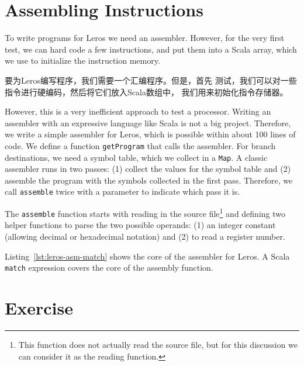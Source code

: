 \documentclass[%
    10pt,
    headinclude, footexclude,
    openright, %
    notitlepage,
    cleardoubleempty,
    headsepline,
    pointlessnumbers,
    bibtotoc, idxtotoc,
    ]{scrbook}
\newcommand{\code}[1]{{\small{\texttt{#1}}}}
\newcommand{\todo}[1]{{\emph{TODO: #1}}}
\renewcommand{\todo}[1]{}
\begin{document}

\section{Assembling Instructions}

To write programs for Leros we need an assembler. However, for the very first
test, we can hard code a few instructions, and put them into a Scala array,
which we use to initialize the instruction memory.

要为Leros编写程序，我们需要一个汇编程序。但是，首先
测试，我们可以对一些指令进行硬编码，然后将它们放入Scala数组中，
我们用来初始化指令存储器。


\noindent However, this is a very inefficient approach to test a processor.
Writing an assembler with an expressive language like Scala is not a big project.
Therefore, we write a simple assembler for Leros, which is possible within about
100 lines of code. We define a function \code{getProgram} that calls the assembler.
For branch destinations, we need a symbol table, which we collect in a \code{Map}.
A classic assembler runs in two passes: (1) collect the values for the symbol table
and (2) assemble the program with the symbols collected in the first pass.
Therefore, we call \code{assemble} twice with a parameter to indicate which pass it is.


The \code{assemble} function starts with reading in the source
file\footnote{This function does not actually read the source file, but for this
discussion we can consider it as the reading function.}
and defining two helper functions to parse the two possible operands: (1) an
integer constant (allowing decimal or hexadecimal notation) and (2) to read
a register number.


Listing~\ref{lst:leros-asm-match} shows the core of the assembler for Leros.
A Scala \code{match} expression covers the core of the assembly function.
\todo{Some more words on the code.}




\section{Exercise}
\end{document}
